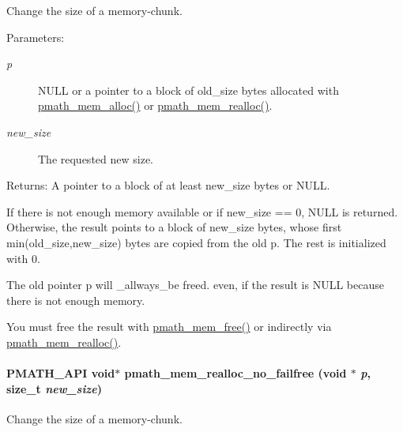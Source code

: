 Change the size of a memory-chunk. 

\begin{Desc}
\item[Parameters:]
\begin{description}
\item[{\em p}]NULL or a pointer to a block of old\_\-size bytes allocated with \hyperlink{group__memory_g856c326c830629de5637912fa8bc2bc9}{pmath\_\-mem\_\-alloc()} or \hyperlink{group__memory_g59dc67a7de0dc3111dfb0424df8d8244}{pmath\_\-mem\_\-realloc()}. \item[{\em new\_\-size}]The requested new size. \end{description}
\end{Desc}
\begin{Desc}
\item[Returns:]A pointer to a block of at least new\_\-size bytes or NULL.\end{Desc}
If there is not enough memory available or if new\_\-size == 0, NULL is returned. Otherwise, the result points to a block of new\_\-size bytes, whose first min(old\_\-size,new\_\-size) bytes are copied from the old p. The rest is initialized with 0.

The old pointer p will \_\-allways\_\-be freed. even, if the result is NULL because there is not enough memory.

You must free the result with \hyperlink{group__memory_g936d3001151c35052812e597eb7dce4f}{pmath\_\-mem\_\-free()} or indirectly via \hyperlink{group__memory_g59dc67a7de0dc3111dfb0424df8d8244}{pmath\_\-mem\_\-realloc()}. \hypertarget{group__memory_g212c329fa5e691842e46580bd94f6e4c}{
\paragraph[{pmath\_\-mem\_\-realloc\_\-no\_\-failfree}]{\setlength{\rightskip}{0pt plus 5cm}PMATH\_\-API void$\ast$ pmath\_\-mem\_\-realloc\_\-no\_\-failfree (void $\ast$ {\em p}, \/  size\_\-t {\em new\_\-size})}\hfill}
\label{group__memory_g212c329fa5e691842e46580bd94f6e4c}


Change the size of a memory-chunk. 

